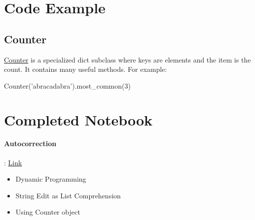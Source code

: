 \section{Code Example} 

\subsection{Counter}
\href{https://docs.python.org/3/library/collections.html#collections.Counter}{Counter} is a specialized dict subclass where keys are elements and the item is the count. It contains many useful methods. For example: 
\begin{python}
Counter('abracadabra').most_common(3)
\end{python}

\section{Completed Notebook}

\paragraph{Autocorrection}:
\href{https://drive.google.com/file/d/1CV5Zee5wwLkynsyB5PRtygWChqyeSq15/view?usp=sharing}{Link}
    \begin{itemize}
        \item Dynamic Programming 
        \item String Edit as List Comprehension 
        \item Using Counter object
    \end{itemize}
    
